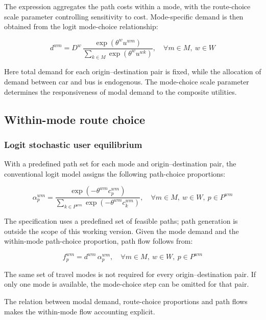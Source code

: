 \documentclass[11pt,a4paper]{article}
\begin{document}
The expression aggregates the path costs within a mode, with the route-choice scale parameter controlling sensitivity to cost. Mode-specific demand is then obtained from the logit mode-choice relationship:

\begin{equation}
d^{wm}=D^w\,\frac{\exp\!\left(\theta^w u^{wm}\right)}{\displaystyle\sum_{k\in M}\exp\!\left(\theta^w u^{wk}\right)},\quad \forall m\in M,\ w\in W
\label{eq:mode-demand}
\end{equation}

Here total demand for each origin--destination pair is fixed, while the allocation of demand between car and bus is endogenous. The mode-choice scale parameter determines the responsiveness of modal demand to the composite utilities.


\subsection{Within-mode route choice}


\subsubsection{Logit stochastic user equilibrium}

With a predefined path set for each mode and origin--destination pair, the conventional logit model assigns the following path-choice proportions:

\begin{equation}
\alpha_p^{wm}=\frac{\exp\!\left(-\theta^{wm}c_p^{wm}\right)}{\displaystyle\sum_{k\in P^{wm}}\exp\!\left(-\theta^{wm}c_k^{wm}\right)},\quad \forall m\in M,\ w\in W,\ p\in P^{wm}
\label{eq:logit-route}
\end{equation}

The specification uses a predefined set of feasible paths; path generation is outside the scope of this working version. Given the mode demand and the within-mode path-choice proportion, path flow follows from:

\begin{equation}
f_p^{wm}=d^{wm}\,\alpha_p^{wm},\quad \forall m\in M,\ w\in W,\ p\in P^{wm}
\label{eq:flow-allocation}
\end{equation}

The same set of travel modes is not required for every origin--destination pair. If only one mode is available, the mode-choice step can be omitted for that pair.

The relation between modal demand, route-choice proportions and path flows makes the within-mode flow accounting explicit.
\end{document}

